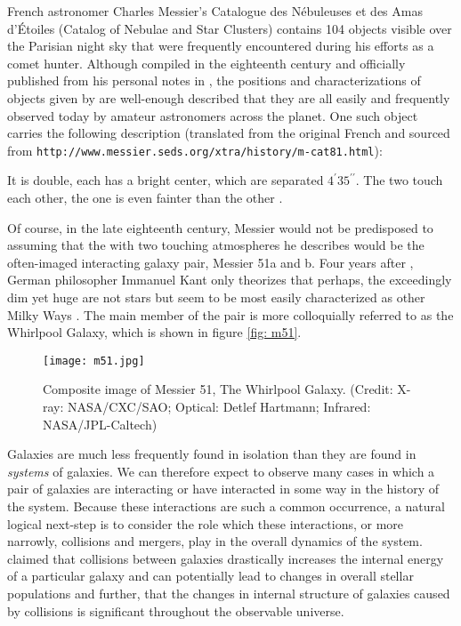 \sloppy
French astronomer Charles Messier's
Catalogue des N{\'e}buleuses et des Amas d'{\'E}toiles (Catalog of Nebulae and
Star Clusters) contains 104 objects visible over the Parisian night sky that
were frequently encountered during his efforts as a comet hunter.
Although compiled in the
eighteenth century and officially published from his personal notes in
\citeyear{Messier},
the positions and characterizations of objects given by \citet{Messier} are
well-enough described that they are all easily and frequently
observed today by amateur astronomers across the planet. One such object carries the following
description (translated from the original French and sourced from
\texttt{http://www.messier.seds.org/xtra/history/m-cat81.html}):
\begin{displayquote}
    It is double, each has a bright center, which are separated
    $4^{\prime}35^{\prime\prime}$.
    The two  touch each other, the one is even fainter than the
    other \cite{Messier}.
\end{displayquote}
Of course, in the late eighteenth century, Messier would not be predisposed to
assuming that the  with two touching atmospheres
he describes would be the often-imaged
interacting galaxy pair, Messier 51a and b.
Four years after \citet{Messier}, German philosopher Immanuel Kant only
theorizes that perhaps, the exceedingly dim yet huge  are not
stars but seem to be most easily characterized as other Milky Ways \cite{kant}.
The main member of the pair is more colloquially referred to as the Whirlpool Galaxy, which is shown in figure \ref{fig: m51}.

\begin{figure}[h]
    \centering
    \texttt{[image: m51.jpg]}
    \caption[Composite image of Messier 51]
    {Composite image of Messier 51, The Whirlpool Galaxy. (Credit:
    X-ray: NASA/CXC/SAO; Optical: Detlef Hartmann; Infrared: NASA/JPL-Caltech)}
    \label{fig: whirlpool}
\end{figure}%


Galaxies are much less frequently found in isolation than they are found
in \textit{systems} of galaxies. We can therefore expect to observe many
cases in which a pair of galaxies are interacting or have interacted in some
way in the history of the system.
Because these interactions are such a common occurrence, a natural
logical next-step is to consider the role which these interactions, or more
narrowly, collisions and mergers, play in the overall dynamics of the system.
\citet{Alladin1965} claimed that collisions between galaxies
drastically increases the internal energy of a particular galaxy and can
potentially lead to changes in overall stellar populations and further,
that the changes in internal structure of galaxies caused by collisions is
significant throughout the observable universe.

